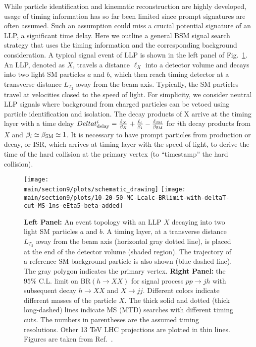 While particle identification and kinematic reconstruction are highly developed,  
usage of timing information has so far been limited since prompt signatures are often assumed. 
Such an assumption could miss a crucial potential signature of an LLP, a significant time delay. 
Here we outline a general BSM signal search strategy that uses the timing information
and the corresponding background consideration.
A typical signal event of LLP is shown in the left panel of Fig.~\ref{fig:ctaulimitHiggs}. 
An LLP, denoted as $X$, travels a distance $\ell_X$ into a detector volume and decays into two light SM particles 
$a$ and $b$, which then reach timing detector at a transverse distance $L_{T_2}$ away from the beam axis. Typically, the SM particles travel at velocities closed to the speed of light.
For simplicity, we consider neutral LLP signals where background from charged particles can be vetoed using 
particle identification and isolation.
The decay products of X arrive at the timing layer with a time delay
$
Delta t^i_{\rm delay} = \frac{\ell_X}{\beta_X} + \frac{\ell_i}{\beta_i} - \frac{\ell_{\rm SM}}{\beta_{\rm SM}}
$
for $i$th decay products from $X$ and $\beta_i \simeq \beta_{\rm SM} \simeq 1 $. 
It is necessary to have prompt particles from production or decay, or ISR, which arrives at timing layer with 
the speed of light, to derive the time of the hard collision at the primary vertex (to ``timestamp'' the hard collision).\\


\begin{figure}[t]
    \centering
    \texttt{[image: \\main/section9/plots/schematic\_drawing]} 
    \texttt{[image: \\main/section9/plots/10-20-50-MC-Lcalc-BRlimit-with-deltaT-cut-MS-1ns-eEta5-beta-added]} 
    \caption{{\bf Left Panel:} An event topology with an LLP $X$ decaying into two light SM particles $a$ and $b$. A timing 
    layer, at a transverse distance $L_{T_2}$ away from the beam axis (horizontal gray dotted line), is placed at the end of the detector volume 
    (shaded region). The trajectory of a reference SM background particle is also shown (blue dashed line).
    The gray polygon indicates the primary vertex.
    {\bf Right Panel:} the $95\%$ C.L. limit on $\text{BR}(h \to XX)$ for signal process $pp \to j h$ with subsequent decay 
    $h\to X X$ and $X \to j j$. Different colors indicate different masses of the particle $X$. 
    The thick solid and dotted (thick long-dashed) lines indicate MS (MTD) searches with different timing cuts. The numbers in parentheses are 
    the assumed timing resolutions. Other 13 TeV LHC projections \cite{Coccaro:2016lnz, Bernaciak:2014pna} are plotted in thin lines. Figures are taken from Ref.~\cite{Liu:2018wte}.
    }
    \label{fig:ctaulimitHiggs}
\end{figure}

